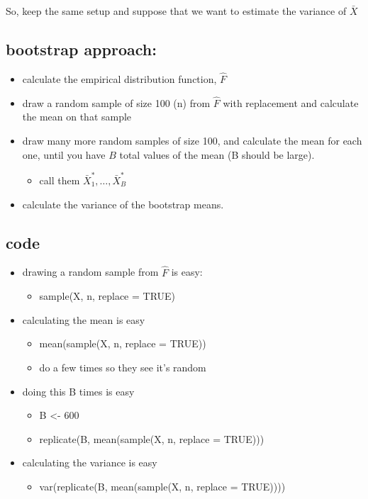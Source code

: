     So, keep the same setup and suppose that we want to estimate the
    variance of $\bar X$

\subsection{bootstrap approach:}

\begin{itemize}
\item calculate the empirical distribution function, $\hat F$
\item draw a random sample of size 100 (n) from $\hat F$ with
         replacement and calculate the mean on that sample
\item draw many more random samples of size 100, and calculate the
         mean for each one, until you have $B$ total values of the mean
         (B should be large).
\begin{itemize}
\item call them $\bar X_1^*,\dots, \bar X_B^*$
\end{itemize}
\item calculate the variance of the bootstrap means.
\end{itemize}

\subsection{code}

\begin{itemize}
\item drawing a random sample from $\hat F$ is easy:
\begin{itemize}
\item sample(X, n, replace = TRUE)
\end{itemize}
\item calculating the mean is easy
\begin{itemize}
\item mean(sample(X, n, replace = TRUE))
\item do a few times so they see it's random
\end{itemize}
\item doing this B times is easy
\begin{itemize}
\item B <- 600
\item replicate(B, mean(sample(X, n, replace = TRUE)))
\end{itemize}
\item calculating the variance is easy
\begin{itemize}
\item var(replicate(B, mean(sample(X, n, replace = TRUE))))
\end{itemize}
\end{itemize}

